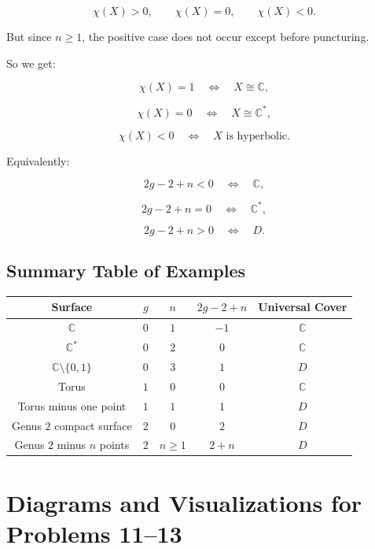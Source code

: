 \documentclass[12pt,a4paper]{article}
\theoremstyle{notespace}
\begin{document}
\[
\chi(X)>0,
\qquad
\chi(X)=0,
\qquad
\chi(X)<0.
\]

But since \(n\ge1\), the positive case does not occur except before puncturing.

So we get:

\[
\chi(X)=1
\quad\Longleftrightarrow\quad
X\cong \mathbb C,
\]

\[
\chi(X)=0
\quad\Longleftrightarrow\quad
X\cong \mathbb C^*,
\]

\[
\chi(X)<0
\quad\Longleftrightarrow\quad
X \text{ is hyperbolic}.
\]

Equivalently:

\[
2g-2+n<0
\quad\Longleftrightarrow\quad
\mathbb C,
\]

\[
2g-2+n=0
\quad\Longleftrightarrow\quad
\mathbb C^*,
\]

\[
2g-2+n>0
\quad\Longleftrightarrow\quad
D.
\]

\subsection{Summary Table of Examples}

\begin{center}
	\renewcommand{\arraystretch}{1.3}
	\begin{tabular}{|c|c|c|c|c|}
		\hline
		Surface & \(g\) & \(n\) & \(2g-2+n\) & Universal Cover\\
		\hline
		\(\mathbb C\) & \(0\) & \(1\) & \(-1\) & \(\mathbb C\)\\
		\hline
		\(\mathbb C^*\) & \(0\) & \(2\) & \(0\) & \(\mathbb C\)\\
		\hline
		\(\mathbb C\setminus\{0,1\}\) & \(0\) & \(3\) & \(1\) & \(D\)\\
		\hline
		Torus & \(1\) & \(0\) & \(0\) & \(\mathbb C\)\\
		\hline
		Torus minus one point & \(1\) & \(1\) & \(1\) & \(D\)\\
		\hline
		Genus \(2\) compact surface & \(2\) & \(0\) & \(2\) & \(D\)\\
		\hline
		Genus \(2\) minus \(n\) points & \(2\) & \(n\ge1\) & \(2+n\) & \(D\)\\
		\hline
	\end{tabular}
\end{center}

\section{Diagrams and Visualizations for Problems 11--13}
\end{document}
